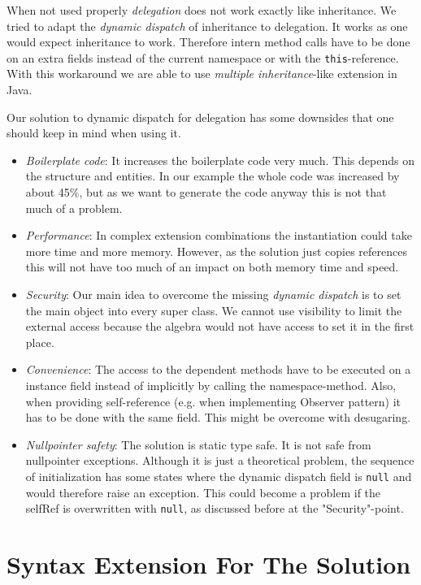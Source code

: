 \documentclass{report}
\begin{document}
When not used properly \emph{delegation} does not work exactly like inheritance. We tried to adapt the \emph{dynamic dispatch} of inheritance to delegation. It works as one would expect inheritance to work. Therefore intern method calls have to be done on an extra fields instead of the current namespace or with the \lstinline{this}-reference. With this workaround we are able to use \emph{multiple inheritance}-like extension in Java.

Our solution to dynamic dispatch for delegation has some downsides that one should keep in mind when using it.
\begin{itemize}
  \item \emph{Boilerplate code}: It increases the boilerplate code very much. This depends on the structure and entities. In our example the whole code was increased by about 45\%, but as we want to generate the code anyway this is not that much of a problem.
  \item \emph{Performance}: In complex extension combinations the instantiation could take more time and more memory. However, as the solution just copies references this will not have too much of an impact on both memory time and speed.
  \item \emph{Security}: Our main idea to overcome the missing \emph{dynamic dispatch} is to set the main object into every super class. We cannot use visibility to limit the external access because the algebra would not have access to set it in the first place.
  \item \emph{Convenience}: The access to the dependent methods have to be executed on a instance field instead of implicitly by calling the namespace-method. Also, when providing self-reference (e.g. when implementing Observer pattern\cite{Gof-Design-1993}) it has to be done with the same field. This might be overcome with desugaring.
  \item \emph{Nullpointer safety}: The solution is static type safe. It is not safe from nullpointer exceptions. Although it is just a theoretical problem, the sequence of initialization has some states where the dynamic dispatch field is \lstinline{null} and would therefore raise an exception. This could become a problem if the selfRef is overwritten with \lstinline{null}, as discussed before at the "Security"-point.
\end{itemize}



\chapter{Syntax Extension For The Solution}
\end{document}

